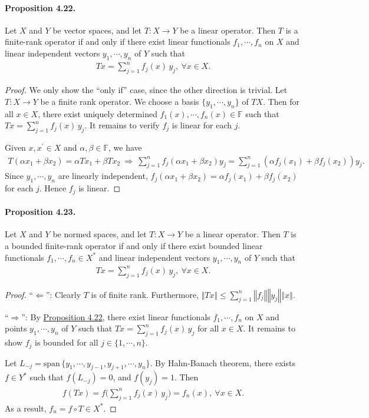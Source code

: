 \documentclass{article}
\begin{document}
\paragraph{Proposition 4.22.\label{prop:4.22}} Let $X$ and $Y$ be vector spaces, and let $T:X\to Y$ be a linear operator. Then $T$ is a finite-rank operator if and only if there exist linear functionals $f_1,\cdots,f_n$ on $X$ and linear independent vectors $y_1,\cdots,y_n$ of $Y$ such that
\begin{align*}
	Tx = \sum_{j=1}^n f_j(x)\,y_j,\ \forall x\in X.
\end{align*}
\begin{proof}
We only show the ``only if'' case, since the other direction is trivial. Let $T:X\to Y$ be a finite rank operator. We choose a basis $\{y_1,\cdots,y_n\}$ of $TX$. Then for all $x\in X$, there exist uniquely determined $f_1(x),\cdots,f_n(x)\in\mathbb{F}$ such that $Tx=\sum_{j=1}^n f_j(x)\,y_j$. It remains to verify $f_j$ is linear for each $j$.

Given $x,x^\prime\in X$ and $\alpha,\beta\in\mathbb{F}$, we have
\begin{align*}
	T(\alpha x_1 + \beta x_2) = \alpha Tx_1 + \beta Tx_2\ \Rightarrow\ \sum_{j=1}^n f_j(\alpha x_1+\beta x_2)y_j = \sum_{j=1}^n \left(\alpha f_j(x_1) + \beta f_j(x_2)\right)y_j.
\end{align*}
Since $y_1,\cdots,y_n$ are linearly independent, $f_j(\alpha x_1+\beta x_2)=\alpha f_j(x_1) + \beta f_j(x_2)$ for each $j$. Hence $f_j$ is linear.
\end{proof}

\paragraph{Proposition 4.23.\label{prop:4.23}} Let $X$ and $Y$ be normed spaces, and let $T:X\to Y$ be a linear operator. Then $T$ is a bounded finite-rank operator if and only if there exist bounded linear functionals $f_1,\cdots,f_n\in X^*$ and linear independent vectors $y_1,\cdots,y_n$ of $Y$ such that
\begin{align*}
	Tx = \sum_{j=1}^n f_j(x)\,y_j,\ \forall x\in X.
\end{align*}
\begin{proof}
``$\Leftarrow$'': Clearly $T$ is of finite rank. Furthermore, $\Vert Tx\Vert\leq\sum_{j=1}^n\left\Vert f_j\right\Vert\left\Vert y_j\right\Vert\left\Vert x\right\Vert$.

``$\Rightarrow$'': By \hyperref[prop:4.22]{Proposition 4.22}, there exist linear functionals $f_1,\cdots,f_n$ on $X$ and points $y_1,\cdots,y_n$ of $Y$ such that $Tx=\sum_{j=1}^n f_j(x)\,y_j$ for all $x\in X$. It remains to show $f_j$ is bounded for all $j\in\{1,\cdots,n\}$.

Let $L_{-j}=\mathrm{span}\,\{y_1,\cdots,y_{j-1},y_{j+1},\cdots,y_n\}$. By Hahn-Banach theorem, there exists $f\in Y^*$ such that $f(L_{-j})=0$, and $f(y_j)=1$. Then
\begin{align*}
	f(Tx) = f\Biggl(\sum_{j=1}^n f_j(x)\,y_j\Biggr) = f_n(x),\ \forall x\in X.
\end{align*}
As a result, $f_n=f\circ T\in X^*$.
\end{proof}
\end{document}
